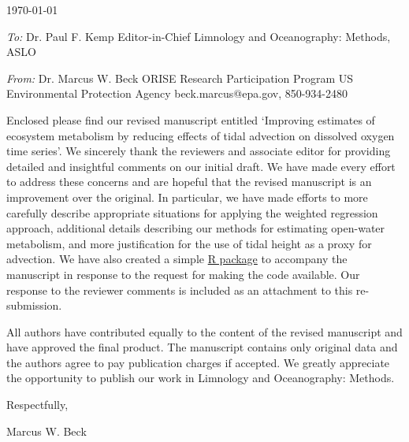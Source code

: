 \documentclass[a4paper,12pt]{article}
\begin{document}
\renewcommand{\rmdefault}{ptm}
\pagestyle{empty} 

\setlength{\parindent}{0mm} 
\setlength{\parskip}{5mm}

\begin{flushright}
\today
\end{flushright}

\emph{To:}\newline
Dr. Paul F. Kemp\newline
Editor-in-Chief\newline
Limnology and Oceanography: Methods, ASLO

\emph{From:}\newline
Dr. Marcus W. Beck\newline
ORISE Research Participation Program\newline
US Environmental Protection Agency\newline
beck.marcus@epa.gov, 850-934-2480\vspace{14.5pt}

\raggedright

Enclosed please find our revised manuscript entitled `Improving estimates of ecosystem metabolism by reducing effects of tidal advection on dissolved oxygen time series'.  We sincerely thank the reviewers and associate editor for providing detailed and insightful comments on our initial draft.  We have made every effort to address these concerns and are hopeful that the revised manuscript is an improvement over the original.  In particular, we have made efforts to more carefully describe appropriate situations for applying the weighted regression approach, additional details describing our methods for estimating open-water metabolism, and more justification for the use of tidal height as a proxy for advection.  We have also created a simple \href{https://github.com/fawda123/WtRegDO}{R package} to accompany the manuscript in response to the request for making the code available.  Our response to the reviewer comments is included as an attachment to this re-submission.

All authors have contributed equally to the content of the revised manuscript and have approved the final product.  The manuscript contains only original data and the authors agree to pay publication charges if accepted.  We greatly appreciate the opportunity to publish our work in Limnology and Oceanography: Methods.\vspace{0.5in}

\hspace{4.5in}Respectfully,

\hspace{4.5in}Marcus W. Beck
\end{document}
